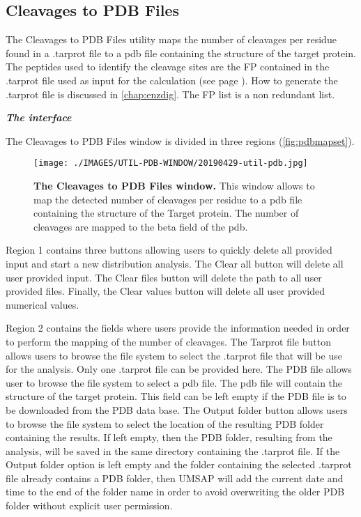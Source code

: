 \subsection{Cleavages to PDB Files}
\label{subsec:cut2pdb}

The Cleavages to PDB Files utility maps the number of cleavages per residue found in a .tarprot file to a pdb file containing the structure of the target protein. The peptides used to identify the cleavage sites are the FP contained in the .tarprot file used as input for the calculation (see page \pageref{par:PIP}). How to generate the .tarprot file is discussed in \autoref{chap:enzdig}. The FP list is a non redundant list.

\textit{\textbf{The interface}}

The Cleavages to PDB Files window is divided in three regions (\autoref{fig:pdbmapset}).

\begin{figure}[h]
	\centering
	\texttt{[image: ./IMAGES/UTIL-PDB-WINDOW/20190429-util-pdb.jpg]}	    
	\caption[The Cleavages to PDB Files window]{\textbf{The Cleavages to PDB Files window.} This window allows to map the detected number of cleavages per residue to a pdb file containing the structure of the Target protein. The number of cleavages are mapped to the beta field of the pdb. } 
	\label{fig:pdbmapset}
	\vspace{-5pt} 	
\end{figure}

Region \num{1} contains three buttons allowing users to quickly delete all provided input and start a new distribution analysis. The Clear all button will delete all user provided input. The Clear files button will delete the path to all user provided files. Finally, the Clear values button will delete all user provided numerical values.

Region \num{2} contains the fields where users provide the information needed in order to perform the mapping of the number of cleavages. The Tarprot file button allows users to browse the file system to select the .tarprot file that will be use for the analysis. Only one .tarprot file can be provided here. The PDB file allows user to browse the file system to select a pdb file. The pdb file will contain the structure of the target protein. This field can be left empty if the PDB file is to be downloaded from the PDB data base. The Output folder button allows users to browse the file system to select the location of the resulting PDB folder containing the results. If left empty, then the PDB folder, resulting from the analysis, will be saved in the same directory containing the .tarprot file. If the Output folder option is left empty and the folder containing the selected .tarprot file already contains a PDB folder, then UMSAP will add the current date and time to the end of the folder name in order to avoid overwriting the older PDB folder without explicit user permission.

